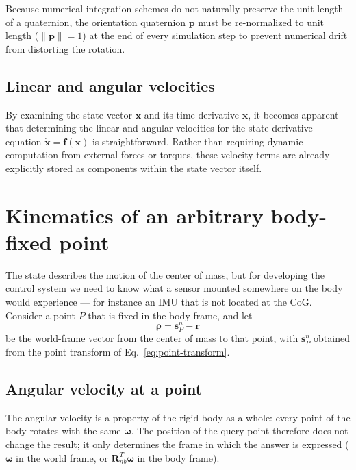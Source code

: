 \documentclass{article}
\begin{document}
	Because numerical integration schemes do not naturally preserve the unit length of a quaternion, the orientation quaternion $\mathbf{p}$ must be re-normalized to unit length ($\|\mathbf{p}\| = 1$) at the end of every simulation step to prevent numerical drift from distorting the rotation.
	
\subsection{Linear and angular velocities}

By examining the state vector $\mathbf{x}$ and its time derivative $\dot{\mathbf{x}}$, it becomes apparent that determining the linear and angular velocities for the state derivative equation $\dot{\mathbf{x}} = \mathbf{f}(\mathbf{x})$ is straightforward. Rather than requiring dynamic computation from external forces or torques, these velocity terms are already explicitly stored as components within the state vector itself.

\section{Kinematics of an arbitrary body-fixed point}
\label{sec:point-kinematics}

The state describes the motion of the center of mass, but for developing the control system we need to know what a sensor mounted somewhere on the body would experience --- for instance an IMU that is not located at the CoG. Consider a point $P$ that is fixed in the body frame, and let
\begin{equation}
	\boldsymbol{\rho} = \mathbf{s}_P^n - \mathbf{r}
\end{equation}
be the world-frame vector from the center of mass to that point, with $\mathbf{s}_P^n$ obtained from the point transform of Eq.~\eqref{eq:point-transform}.

\subsection{Angular velocity at a point}

The angular velocity is a property of the rigid body as a whole: every point of the body rotates with the same $\boldsymbol{\omega}$. The position of the query point therefore does not change the result; it only determines the frame in which the answer is expressed ($\boldsymbol{\omega}$ in the world frame, or $\mathbf{R}_{nb}^T\boldsymbol{\omega}$ in the body frame).
\end{document}
